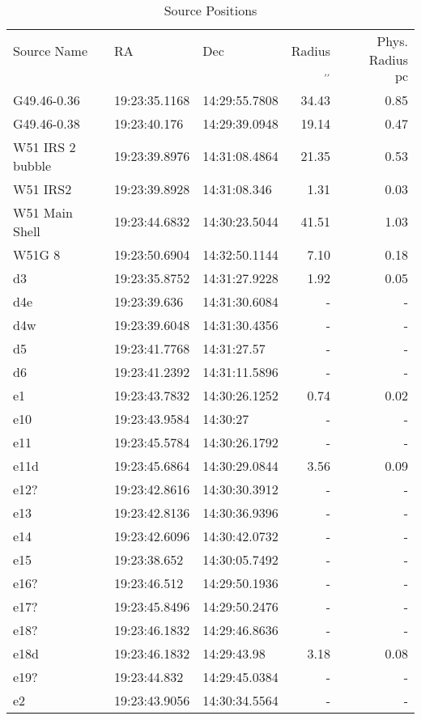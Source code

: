 \begin{table*}[htp]
\caption{Source Positions}
\begin{tabular}{lllrr}
\label{tab:positions}
Source Name & RA & Dec & Radius & Phys. Radius \\
 &  &  & $\mathrm{{}^{\prime\prime}}$ & $\mathrm{pc}$ \\
\hline
G49.46-0.36 & 19:23:35.1168 & 14:29:55.7808 & 34.43 & 0.85 \\
G49.46-0.38 & 19:23:40.176 & 14:29:39.0948 & 19.14 & 0.47 \\
W51 IRS 2 bubble & 19:23:39.8976 & 14:31:08.4864 & 21.35 & 0.53 \\
W51 IRS2 & 19:23:39.8928 & 14:31:08.346 & 1.31 & 0.03 \\
W51 Main Shell & 19:23:44.6832 & 14:30:23.5044 & 41.51 & 1.03 \\
W51G 8 & 19:23:50.6904 & 14:32:50.1144 & 7.10 & 0.18 \\
d3 & 19:23:35.8752 & 14:31:27.9228 & 1.92 & 0.05 \\
d4e & 19:23:39.636 & 14:31:30.6084 & - & - \\
d4w & 19:23:39.6048 & 14:31:30.4356 & - & - \\
d5 & 19:23:41.7768 & 14:31:27.57 & - & - \\
d6 & 19:23:41.2392 & 14:31:11.5896 & - & - \\
e1 & 19:23:43.7832 & 14:30:26.1252 & 0.74 & 0.02 \\
e10 & 19:23:43.9584 & 14:30:27 & - & - \\
e11 & 19:23:45.5784 & 14:30:26.1792 & - & - \\
e11d & 19:23:45.6864 & 14:30:29.0844 & 3.56 & 0.09 \\
e12? & 19:23:42.8616 & 14:30:30.3912 & - & - \\
e13 & 19:23:42.8136 & 14:30:36.9396 & - & - \\
e14 & 19:23:42.6096 & 14:30:42.0732 & - & - \\
e15 & 19:23:38.652 & 14:30:05.7492 & - & - \\
e16? & 19:23:46.512 & 14:29:50.1936 & - & - \\
e17? & 19:23:45.8496 & 14:29:50.2476 & - & - \\
e18? & 19:23:46.1832 & 14:29:46.8636 & - & - \\
e18d & 19:23:46.1832 & 14:29:43.98 & 3.18 & 0.08 \\
e19? & 19:23:44.832 & 14:29:45.0384 & - & - \\
e2 & 19:23:43.9056 & 14:30:34.5564 & - & - \\

\end{tabular}
\end{table*}
